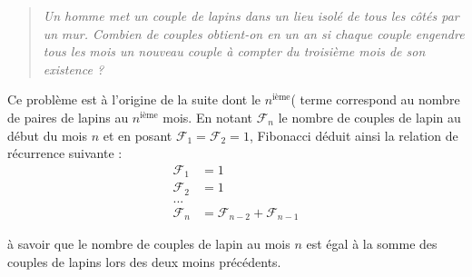 \documentclass{book}
\begin{document}
\begin{quote}
\emph{Un homme met un couple de lapins dans un lieu isolé de tous les côtés par un}
\emph{mur. Combien de couples obtient-on en un an si chaque couple engendre tous les}
\emph{mois un nouveau couple à compter du troisième mois de son existence ?}
\end{quote}

Ce problème est à l'origine de la suite dont le \(n\)\(^{\text{ième}}\)( terme
correspond au nombre de paires de lapins au \(n\)\(^{\text{ième}}\) mois. En
notant \(\mathcal{F}_n\) le nombre de couples de lapin au début du mois
\(n\) et en posant \(\mathcal{F}_1=\mathcal{F}_2=1\), Fibonacci déduit
ainsi la relation de récurrence suivante :
\begin{align*}
\mathcal{F}_1 &= 1 \\
\mathcal{F}_2 &= 1 \\
...\\
\mathcal{F}_n &= \mathcal{F}_{n-2}+\mathcal{F}_{n-1}
\end{align*}

à savoir que le nombre de couples de lapin au mois \(n\) est égal à la
somme des couples de lapins lors des deux moins précédents.\\
\end{document}

